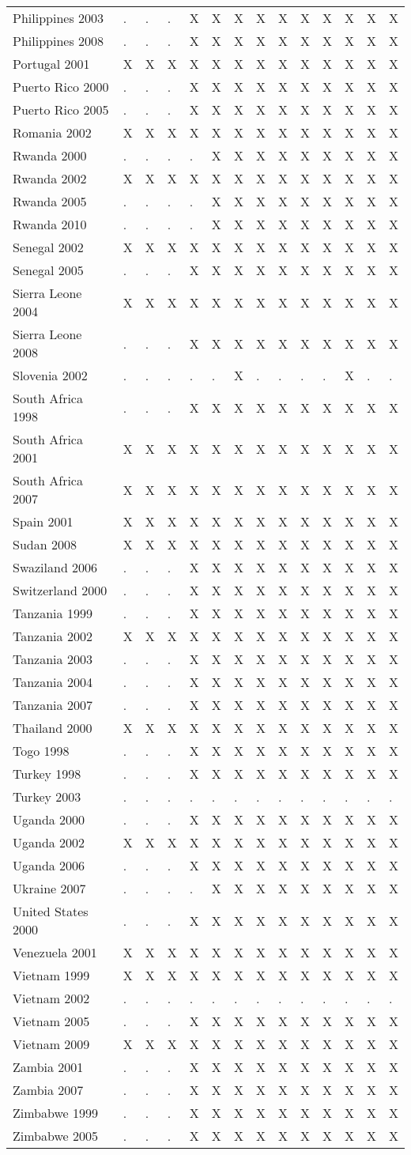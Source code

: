 \documentclass[a4paper]{article}
\begin{document}
\begin{longtable}{llllllllllllll}
\newpage
Philippines 2003&.&.&.&X&X&X&X&X&X&X&X&X&X\tabularnewline
Philippines 2008&.&.&.&X&X&X&X&X&X&X&X&X&X\tabularnewline
Portugal 2001&X&X&X&X&X&X&X&X&X&X&X&X&X\tabularnewline
Puerto Rico 2000&.&.&.&X&X&X&X&X&X&X&X&X&X\tabularnewline
Puerto Rico 2005&.&.&.&X&X&X&X&X&X&X&X&X&X\tabularnewline
Romania 2002&X&X&X&X&X&X&X&X&X&X&X&X&X\tabularnewline
Rwanda 2000&.&.&.&.&X&X&X&X&X&X&X&X&X\tabularnewline
Rwanda 2002&X&X&X&X&X&X&X&X&X&X&X&X&X\tabularnewline
Rwanda 2005&.&.&.&.&X&X&X&X&X&X&X&X&X\tabularnewline
Rwanda 2010&.&.&.&.&X&X&X&X&X&X&X&X&X\tabularnewline
Senegal 2002&X&X&X&X&X&X&X&X&X&X&X&X&X\tabularnewline
Senegal 2005&.&.&.&X&X&X&X&X&X&X&X&X&X\tabularnewline
Sierra Leone 2004&X&X&X&X&X&X&X&X&X&X&X&X&X\tabularnewline
Sierra Leone 2008&.&.&.&X&X&X&X&X&X&X&X&X&X\tabularnewline
Slovenia 2002&.&.&.&.&.&X&.&.&.&.&X&.&.\tabularnewline
South Africa 1998&.&.&.&X&X&X&X&X&X&X&X&X&X\tabularnewline
South Africa 2001&X&X&X&X&X&X&X&X&X&X&X&X&X\tabularnewline
South Africa 2007&X&X&X&X&X&X&X&X&X&X&X&X&X\tabularnewline
Spain 2001&X&X&X&X&X&X&X&X&X&X&X&X&X\tabularnewline
Sudan 2008&X&X&X&X&X&X&X&X&X&X&X&X&X\tabularnewline
Swaziland 2006&.&.&.&X&X&X&X&X&X&X&X&X&X\tabularnewline
Switzerland 2000&.&.&.&X&X&X&X&X&X&X&X&X&X\tabularnewline
Tanzania 1999&.&.&.&X&X&X&X&X&X&X&X&X&X\tabularnewline
Tanzania 2002&X&X&X&X&X&X&X&X&X&X&X&X&X\tabularnewline
Tanzania 2003&.&.&.&X&X&X&X&X&X&X&X&X&X\tabularnewline
Tanzania 2004&.&.&.&X&X&X&X&X&X&X&X&X&X\tabularnewline
Tanzania 2007&.&.&.&X&X&X&X&X&X&X&X&X&X\tabularnewline
Thailand 2000&X&X&X&X&X&X&X&X&X&X&X&X&X\tabularnewline
Togo 1998&.&.&.&X&X&X&X&X&X&X&X&X&X\tabularnewline
Turkey 1998&.&.&.&X&X&X&X&X&X&X&X&X&X\tabularnewline
Turkey 2003&.&.&.&.&.&.&.&.&.&.&.&.&.\tabularnewline
Uganda 2000&.&.&.&X&X&X&X&X&X&X&X&X&X\tabularnewline
Uganda 2002&X&X&X&X&X&X&X&X&X&X&X&X&X\tabularnewline
Uganda 2006&.&.&.&X&X&X&X&X&X&X&X&X&X\tabularnewline
Ukraine 2007&.&.&.&.&X&X&X&X&X&X&X&X&X\tabularnewline
United States 2000&.&.&.&X&X&X&X&X&X&X&X&X&X\tabularnewline
Venezuela 2001&X&X&X&X&X&X&X&X&X&X&X&X&X\tabularnewline
Vietnam 1999&X&X&X&X&X&X&X&X&X&X&X&X&X\tabularnewline
Vietnam 2002&.&.&.&.&.&.&.&.&.&.&.&.&.\tabularnewline
Vietnam 2005&.&.&.&X&X&X&X&X&X&X&X&X&X\tabularnewline
\newpage
Vietnam 2009&X&X&X&X&X&X&X&X&X&X&X&X&X\tabularnewline
Zambia 2001&.&.&.&X&X&X&X&X&X&X&X&X&X\tabularnewline
Zambia 2007&.&.&.&X&X&X&X&X&X&X&X&X&X\tabularnewline
Zimbabwe 1999&.&.&.&X&X&X&X&X&X&X&X&X&X\tabularnewline
Zimbabwe 2005&.&.&.&X&X&X&X&X&X&X&X&X&X\tabularnewline
\hline
 \end{longtable}\pagebreak
%
\end{document}
